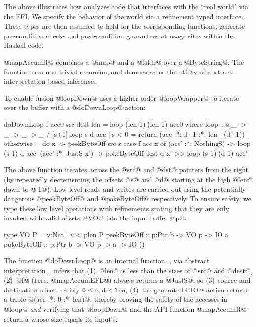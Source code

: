 The above illustrates how \toolname analyzes code that interfaces 
with the ``real world" via the \C FFI. We specify the behavior 
of the world via a refinement typed interface. These types are then assumed
to hold for the corresponding functions, \ie generate pre-condition checks
and post-condition guarantees at usage sites within the Haskell code.


@mapAccumR@ combines a @map@ and a @foldr@ over a @ByteString@. 
The function uses non-trivial recursion, and demonstrates 
the utility of abstract-interpretation based inference. 
%
To enable fusion \cite{streamfusion} 
@loopDown@ uses a higher order @loopWrapper@ 
to iterate over the buffer with a @doDownLoop@ action:
%
\begin{code}
  doDownLoop f acc0 src dest len = loop (len-1) (len-1) acc0
    where
     loop :: s:_ -> _ -> _ -> _ / [s+1]
     loop s d acc 
       | s < 0 
       = return (acc :*: d+1 :*: len - (d+1))
       | otherwise       
       = do x <- peekByteOff src s
            case f acc x of
              (acc' :*: NothingS) -> 
                   loop (s-1) d acc'
              (acc' :*: JustS x') -> 
                   pokeByteOff dest d x'
                >> loop (s-1) (d-1) acc'
\end{code}

The above function iterates across the @src@ and @dst@ 
pointers from the right (by repeatedly decrementing the 
offsets @s@ and @d@ starting at the high @len@ down to @-1@). 
Low-level reads and writes are carried out using the 
potentially dangerous @peekByteOff@ and @pokeByteOff@ 
respectively. To ensure safety, we type these low level 
operations with refinements stating that they are only 
invoked with valid offsets @VO@ into the input buffer @p@.

\begin{code}
  type VO P    = {v:Nat | v < plen P}
  peekByteOff :: p:Ptr b -> VO p -> IO a
  pokeByteOff :: p:Ptr b -> VO p -> a -> IO ()
\end{code}

The function @doDownLoop@ is an internal function.
\toolname, via abstract interpretation~\cite{LiquidPLDI08}, 
infers that
%
(1)~@len@ is less than the sizes of @src@ and @dest@,
(2)~@f@ (here, @mapAccumEFL@) always returns a @JustS@, so
(3)~source and destination offsets satisfy $$,
(4)~the generated @IO@ action returns a triple @(acc :*: 0 :*: len)@,
%
thereby proving the safety of the accesses in @loop@ \emph{and}
verifying that @loopDown@ and the API function @mapAccumR@ 
return a \bytestring whose size equals its input's.
 
